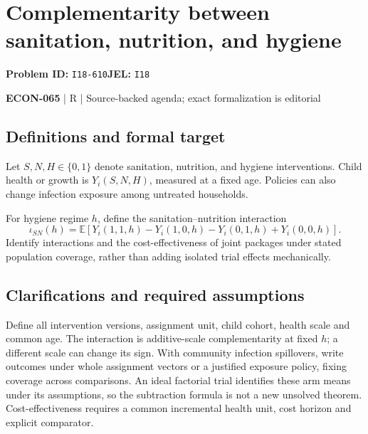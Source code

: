 \documentclass[11pt,a4paper]{article}
\begin{document}
\section*{Complementarity between sanitation, nutrition, and hygiene}
\textbf{Problem ID:} \texttt{I18-610}\quad \textbf{JEL:} \texttt{I18}\par
\label{problem:OP-0634}


\label{audited:ECON-065}

{\sffamily\small\color{muted}\textbf{ECON-065} | R | Source-backed agenda; exact formalization is editorial\par}

\subsection*{Definitions and formal target}

Let $S,N,H\in\{0,1\}$ denote sanitation, nutrition, and hygiene interventions. Child health or growth is $Y_i(S,N,H)$, measured at a fixed age. Policies can also change infection exposure among untreated households.

For hygiene regime $h$, define the sanitation–nutrition interaction
\[
 \iota_{SN}(h)=\mathbb E[Y_i(1,1,h)-Y_i(1,0,h)-Y_i(0,1,h)+Y_i(0,0,h)].
\]
Identify interactions and the cost-effectiveness of joint packages under stated population coverage, rather than adding isolated trial effects mechanically.

\subsection*{Clarifications and required assumptions}

Define all intervention versions, assignment unit, child cohort, health scale and common age. The interaction is additive-scale complementarity at fixed \(h\); a different scale can change its sign. With community infection spillovers, write outcomes under whole assignment vectors or a justified exposure policy, fixing coverage across comparisons. An ideal factorial trial identifies these arm means under its assumptions, so the subtraction formula is not a new unsolved theorem. Cost-effectiveness requires a common incremental health unit, cost horizon and explicit comparator.
\end{document}
